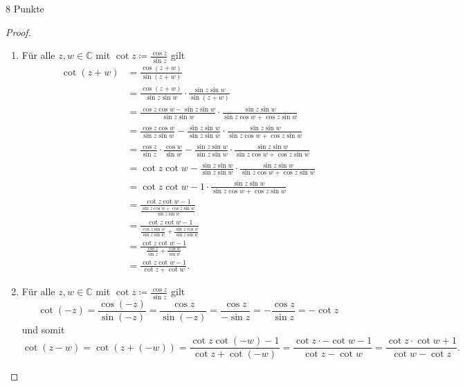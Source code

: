 \documentclass{problemset}
\begin{document}
\begin{problem}{8 Punkte}
\begin{proof}
	\begin{enumerate}
		\item Für alle $z, w \in \mathbb{C}$ mit $\cot z \coloneqq \frac{\cos z}{\sin z}$ gilt
		      \begin{align*}
			      \cot (z + w) & = \frac{\cos (z + w)}{\sin (z + w)}                                                                                                                 \\
			                   & = \frac{\cos (z + w)}{\sin z \sin w} \cdot \frac{\sin z \sin w}{\sin (z + w)}                                                                       \\
			                   & = \frac{\cos z \cos w - \sin z \sin w}{\sin z \sin w} \cdot \frac{\sin z \sin w}{\sin z \cos w + \cos z \sin w}                                     \\
			                   & = \frac{\cos z \cos w}{\sin z \sin w} - \frac{\sin z \sin w}{\sin z \sin w} \cdot \frac{\sin z \sin w}{\sin z \cos w + \cos z \sin w}               \\
			                   & = \frac{\cos z}{\sin z} \cdot \frac{\cos w}{\sin w} - \frac{\sin z \sin w}{\sin z \sin w} \cdot \frac{\sin z \sin w}{\sin z \cos w + \cos z \sin w} \\
			                   & = \cot z \cot w - \frac{\sin z \sin w}{\sin z \sin w} \cdot \frac{\sin z \sin w}{\sin z \cos w + \cos z \sin w}                                     \\
			                   & = \cot z \cot w - 1 \cdot \frac{\sin z \sin w}{\sin z \cos w + \cos z \sin w}                                                                       \\
			                   & = \frac{\cot z \cot w - 1}{\frac{\sin z \cos w + \cos z \sin w}{\sin z \sin w}}                                                                     \\
			                   & = \frac{\cot z \cot w - 1}{\frac{\cos z \sin w}{\sin z \sin w} + \frac{\sin z \cos w}{\sin z \sin w}}                                               \\
			                   & = \frac{\cot z \cot w - 1}{\frac{\cos z }{\sin z} + \frac{\cos w}{\sin w}}                                                                          \\
			                   & = \frac{\cot z \cot w - 1}{\cot z + \cot w}.
		      \end{align*}

		\item Für alle $z, w \in \mathbb{C}$ mit $\cot z \coloneqq \frac{\cos z}{\sin z}$ gilt
		      \[
			      \cot (-z) = \frac{\cos (-z)}{\sin (-z)} = \frac{\cos z}{\sin (-z)} = \frac{\cos z}{ - \sin z} = - \frac{\cos z}{ \sin z} = - \cot z
		      \]
		      und somit
		      \[
			      \cot(z - w) = \cot(z + (-w)) = \frac{\cot z \cot (-w) - 1}{\cot z + \cot (-w)} = \frac{\cot z \cdot -\cot w - 1}{\cot z - \cot w} = \frac{\cot z \cdot \cot w + 1}{\cot w  - \cot z}.
		      \]


\end{enumerate}
\end{proof}
\end{problem}
\end{document}

